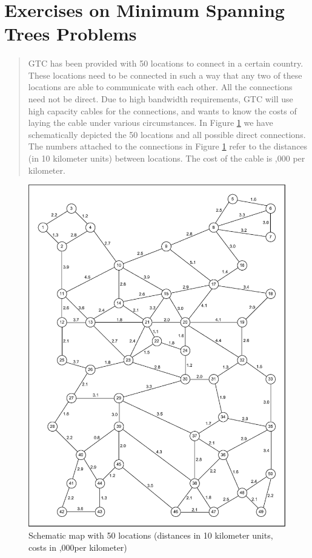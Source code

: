 \section{Exercises on Minimum Spanning Trees Problems}

\paragraph{}
\begin{quote}
	GTC has been provided with 50 locations to connect in a certain country. These locations need
to be connected in such a way that any two of these locations are able to communicate
with each other. All the connections need not be direct. Due to high bandwidth
requirements, GTC will use high capacity cables for the connections, and wants to
know the costs of laying the cable under various circumstances. In Figure \ref{graph2-1} we
have schematically depicted the 50 locations and all possible direct connections. The
numbers attached to the connections in Figure \ref{graph2-1} refer to the distances (in 10 kilometer
units) between locations. The cost of the cable is ,000 per kilometer.
\end{quote}

\begin{figure}[H]
	\centering
	\includegraphics[scale=0.5]{./img/graph2-1.png}
	\caption{Schematic map with 50 locations (distances in 10 kilometer units, costs in ,000per kilometer)}
	\label{graph2-1}
\end{figure}

